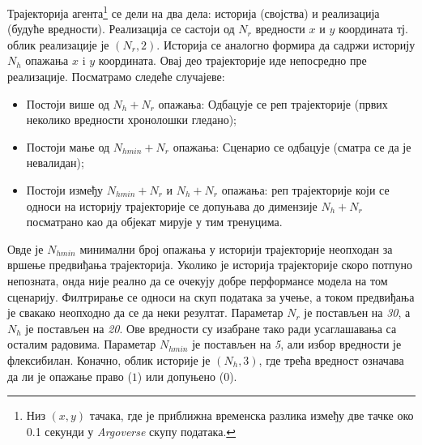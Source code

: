\documentclass[11pt,oneside]{memoir}
\begin{document}
Трајекторија агента\footnote{Низ $(x, y)$ тачака, где је приближна временска разлика између две тачке око 0.1 секунди у \textit{Argoverse}
скупу података.} 
се дели на два дела: историја (својства) и реализација (будуће вредности). Реализација се састоји од $N_r$ вредности
$x$ и $y$ координата тј. облик реализације је $(N_r, 2)$.
Историја се аналогно формира да садржи историју $N_h$ опажања $x$ i $y$ координата. Овај део трајекторије иде непосредно
пре реализације. Посматрамо следеће случајеве:
\begin{itemize}
  \item Постоји више од $N_h + N_r$ опажања: Одбацује се реп трајекторије (првих неколико вредности хронолошки гледано);
  \item Постоји мање од $N_{hmin} + N_r$ опажања: Сценарио се одбацује (сматра се да је невалидан);
  \item Постоји између $N_{hmin} + N_r$ и $N_h + N_r$ опажања: реп трајекторије који се односи на историју трајекторије 
        се допуњава до димензије $N_h + N_r$ посматрано као да објекат мирује у тим тренуцима.
\end{itemize}
Овде је $N_{hmin}$ минимални број опажања у историји трајекторије неопходан за вршење предвиђања трајекторија. Уколико је историја
трајекторије скоро потпуно непозната, онда није реално да се очекују добре перформансе модела на том сценарију. Филтрирање се
односи на скуп података за учење, а током предвиђања је свакако неопходно да се да неки резултат. Параметар $N_r$ је постављен на \textit{30},
а $N_h$ је постављен на \textit{20}. Ове вредности су изабране тако ради усаглашавања са осталим радовима. Параметар $N_{hmin}$ је
постављен на \textit{5}, али избор вредности је флексибилан. 
Коначно, облик историје је $(N_h, 3)$, где трећа вредност означава да ли је опажање право ($1$) или допуњено ($0$).
\end{document}
